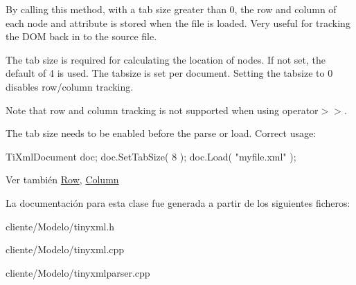 \-By calling this method, with a tab size greater than 0, the row and column of each node and attribute is stored when the file is loaded. \-Very useful for tracking the \-D\-O\-M back in to the source file.

\-The tab size is required for calculating the location of nodes. \-If not set, the default of 4 is used. \-The tabsize is set per document. \-Setting the tabsize to 0 disables row/column tracking.

\-Note that row and column tracking is not supported when using operator$>$$>$.

\-The tab size needs to be enabled before the parse or load. \-Correct usage\-: \begin{DoxyVerb}
		TiXmlDocument doc;
		doc.SetTabSize( 8 );
		doc.Load( "myfile.xml" );
		\end{DoxyVerb}


\begin{DoxySeeAlso}{\-Ver también}
\hyperlink{classTiXmlBase_a024bceb070188df92c2a8d8852dd0853}{\-Row}, \hyperlink{classTiXmlBase_ab54bfb9b70fe6dd276e7b279cab7f003}{\-Column} 
\end{DoxySeeAlso}


\-La documentación para esta clase fue generada a partir de los siguientes ficheros\-:\begin{DoxyCompactItemize}
\item 
cliente/\-Modelo/tinyxml.\-h\item 
cliente/\-Modelo/tinyxml.\-cpp\item 
cliente/\-Modelo/tinyxmlparser.\-cpp\end{DoxyCompactItemize}

